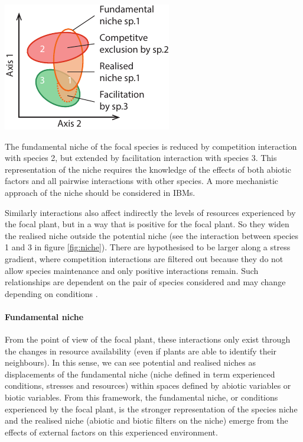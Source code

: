 \begin{marginfigure}
    \includegraphics{./1_Introduction/graphics/niches.pdf}
  \caption[Different niches]{The fundamental niche of the \textcolor{myOrange}{focal} species is reduced by competition interaction with \textcolor{myRed}{species 2}, but extended by facilitation interaction with \textcolor{myGreen}{species 3}. This representation of the niche requires the knowledge of the effects of both abiotic factors and all pairwise interactions with other species. A more mechanistic approach of the niche should be considered in IBMs.}
  \label{fig:niche}
\end{marginfigure}

Similarly  interactions also affect indirectly the levels of resources experienced by the focal plant, but in a way that is positive for the focal plant. So they widen the realised niche outside the potential niche (see the interaction between species 1 and 3 in figure \ref{fig:niche}). There are hypothesised to be larger along a stress gradient, where competition interactions are filtered out because they do not allow species maintenance and only positive interactions remain. Such relationships are dependent on the pair of species considered and may change depending on conditions \parencite{callaway_phenotypic_2003}.

\paragraph{Fundamental niche}
 From the point of view of the focal plant, these interactions only exist through the changes in resource availability (even if plants are able to identify their neighbours). In this sense, we can see potential and realised niches as displacements of the fundamental niche (niche defined in term experienced conditions, stresses and resources)  within spaces defined by abiotic variables or biotic variables. From this framework, the fundamental niche, or conditions experienced by the focal plant, is the stronger representation of the species niche and the realised niche (abiotic and biotic filters on the niche) emerge from the effects of external factors on this experienced environment.

